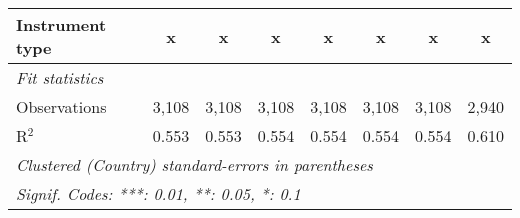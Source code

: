 \begin{table}[htbp]
\begin{tabular}{lccccccc}
      Instrument type                                                         & x            & x            & x            & x            & x            & x            & x\\  
      \midrule \emph{Fit statistics}\\
      Observations                                                            & 3,108        & 3,108        & 3,108        & 3,108        & 3,108        & 3,108        & 2,940\\  
      R$^2$                                                                   & 0.553        & 0.553        & 0.554        & 0.554        & 0.554        & 0.554        & 0.610\\  
      \midrule
      \multicolumn{8}{l}{\emph{Clustered (Country) standard-errors in parentheses}}\\
      \multicolumn{8}{l}{\emph{Signif. Codes: ***: 0.01, **: 0.05, *: 0.1}}\\
   \end{tabular}
\end{table}


